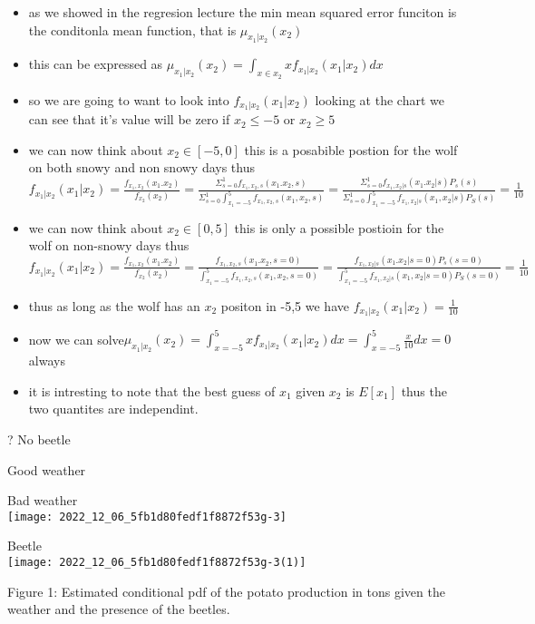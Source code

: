 \documentclass[10pt]{article}
\begin{document}
\begin{itemize}
    \item as we showed in the regresion lecture the min mean squared error funciton is the conditonla mean function, that is $\mu_{x_1|x_2}(x_2)$
    \item this can be expressed as $\mu_{x_1|x_2}(x_2)=\int_{x\in x_2}xf_{x_1|x_2}(x_1|x_2)dx$
    \item so we are going to want to look into $f_{x_1|x_2}(x_1|x_2)$ looking at the chart we can see that it's value will be zero if $x_2\leq -5$
    or $x_2\geq5$ 
    \item we can now think about $x_2\in[-5,0]$ this is a posabible postion for the wolf on both snowy and non snowy days thus 
    $f_{x_1|x_2}(x_1|x_2)=\frac{f_{x_1,x_2}(x_1.x_2)}{f_{x_2}(x_2)}=
    \frac{\Sigma_{s=0}^{1}f_{x_1,x_2,s}(x_1.x_2,s)}{\Sigma_{s=0}^{1}\int_{x_1=-5}^{5}f_{x_1,x_2,s}(x_1,x_2,s)}=
    \frac{\Sigma_{s=0}^{1}f_{x_1,x_2|s}(x_1.x_2|s)P_{s}(s)}{\Sigma_{s=0}^{1}\int_{x_1=-5}^{5}f_{x_1,x_2|s}(x_1,x_2|s)P_{S}(s)}=\frac{1}{10}$
    \item we can now think about $x_2\in[0,5]$ this is only a possible postioin for the wolf on non-snowy days thus
    $f_{x_1|x_2}(x_1|x_2)=\frac{f_{x_1,x_2}(x_1.x_2)}{f_{x_2}(x_2)}=
    \frac{f_{x_1,x_2,s}(x_1.x_2,s=0)}{\int_{x_1=-5}^{5}f_{x_1,x_2,s}(x_1,x_2,s=0)}=
    \frac{f_{x_1,x_2|s}(x_1.x_2|s=0)P_{s}(s=0)}{\int_{x_1=-5}^{5}f_{x_1,x_2|s}(x_1,x_2|s=0)P_{S}(s=0)}=\frac{1}{10}$
    \item thus as long as the wolf has an $x_2$ positon in -5,5 we have $f_{x_1|x_2}(x_1|x_2)=\frac{1}{10}$
    \item now we can solve$\mu_{x_1|x_2}(x_2)=\int_{x=-5}^{5}xf_{x_1|x_2}(x_1|x_2)dx=\int_{x=-5}^{5}\frac{x}{10}dx=0$ always 
    \item it is intresting to note that the best guess of $x_1$ given $x_2$ is $E[x_1]$ thus the two quantites are independint. 
\end{itemize}


? No beetle

Good weather

Bad weather\\
\texttt{[image: 2022\_12\_06\_5fb1d80fedf1f8872f53g-3]}

Beetle\\
\texttt{[image: 2022\_12\_06\_5fb1d80fedf1f8872f53g-3(1)]}

Figure 1: Estimated conditional pdf of the potato production in tons given the weather and the presence of the beetles.
\end{document}

